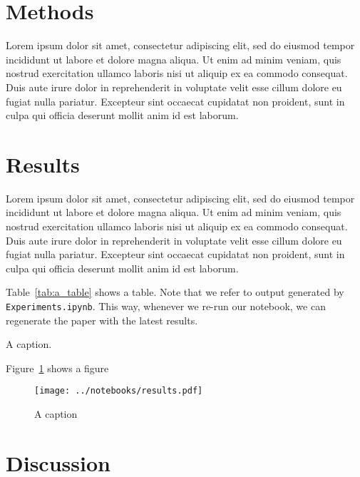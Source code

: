 \documentclass[11pt,a4paper]{article}
\begin{document}
\section{Methods}

Lorem ipsum dolor sit amet, consectetur adipiscing elit, sed do eiusmod tempor incididunt ut labore et dolore magna aliqua. Ut enim ad minim veniam, quis nostrud exercitation ullamco laboris nisi ut aliquip ex ea commodo consequat. Duis aute irure dolor in reprehenderit in voluptate velit esse cillum dolore eu fugiat nulla pariatur. Excepteur sint occaecat cupidatat non proident, sunt in culpa qui officia deserunt mollit anim id est laborum.



\section{Results}

Lorem ipsum dolor sit amet, consectetur adipiscing elit, sed do eiusmod tempor incididunt ut labore et dolore magna aliqua. Ut enim ad minim veniam, quis nostrud exercitation ullamco laboris nisi ut aliquip ex ea commodo consequat. Duis aute irure dolor in reprehenderit in voluptate velit esse cillum dolore eu fugiat nulla pariatur. Excepteur sint occaecat cupidatat non proident, sunt in culpa qui officia deserunt mollit anim id est laborum.


Table~\ref{tab:a_table} shows a table. Note that we refer to output generated by \texttt{Experiments.ipynb}. This way, whenever we re-run our notebook, we can regenerate the paper with the latest results.

\begin{table}[ht]
\centering

\caption{\label{tab:a_table} A caption. }
\end{table}

Figure~\ref{fig:a_label} shows a figure

\begin{figure}[ht]
	\centering
	\texttt{[image: ../notebooks/results.pdf]}
	\caption{A caption}
	\label{fig:a_label}
\end{figure}

\section{Discussion}
\end{document}
